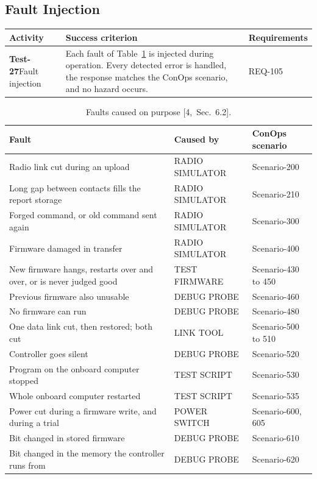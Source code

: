 \documentclass[11pt,a4paper]{article}
\begin{document}
\subsection{Fault Injection}
{\footnotesize
\begin{xltabular}{\textwidth}{@{}>{\raggedright\arraybackslash}p{3.0cm}>{\raggedright\arraybackslash}X>{\raggedright\arraybackslash}p{2.4cm}@{}}
\toprule
Activity & Success criterion & Requirements \\
\midrule
\endhead
\textbf{Test-27}\newline Fault injection & Each fault of Table~\ref{tab:faults} is injected during operation. Every detected error is handled, the response matches the ConOps scenario, and no hazard occurs. & REQ-105 \\
\bottomrule
\end{xltabular}}
\addtocounter{table}{-1}

\begin{table}[H]
\centering
{\small\begin{tabularx}{\textwidth}{@{}>{\raggedright\arraybackslash}Xll@{}}
\toprule
Fault & Caused by & ConOps scenario \\
\midrule
Radio link cut during an upload & RADIO SIMULATOR & Scenario-200 \\
Long gap between contacts fills the report storage & RADIO SIMULATOR & Scenario-210 \\
Forged command, or old command sent again & RADIO SIMULATOR & Scenario-300 \\
Firmware damaged in transfer & RADIO SIMULATOR & Scenario-400 \\
New firmware hangs, restarts over and over, or is never judged good & TEST FIRMWARE & Scenario-430 to 450 \\
Previous firmware also unusable & DEBUG PROBE & Scenario-460 \\
No firmware can run & DEBUG PROBE & Scenario-480 \\
One data link cut, then restored; both cut & LINK TOOL & Scenario-500 to 510 \\
Controller goes silent & DEBUG PROBE & Scenario-520 \\
Program on the onboard computer stopped & TEST SCRIPT & Scenario-530 \\
Whole onboard computer restarted & TEST SCRIPT & Scenario-535 \\
Power cut during a firmware write, and during a trial & POWER SWITCH & Scenario-600, 605 \\
Bit changed in stored firmware & DEBUG PROBE & Scenario-610 \\
Bit changed in the memory the controller runs from & DEBUG PROBE & Scenario-620 \\
\bottomrule
\end{tabularx}}
\caption{Faults caused on purpose [4,~Sec.~6.2].}
\label{tab:faults}
\end{table}
\end{document}
